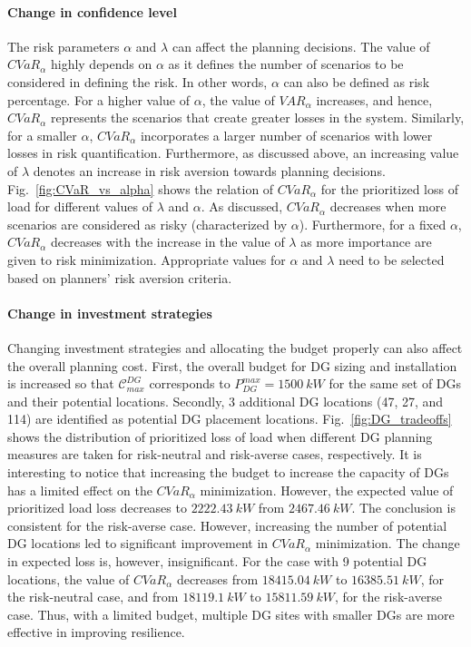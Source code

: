 \documentclass[hidelinks, 12pt]{article}
\begin{document}
\paragraph{Change in confidence level}
The risk parameters $\alpha$ and $\lambda$ can affect the planning decisions. The value of $CVaR_\alpha$ highly depends on $\alpha$ as it defines the number of scenarios to be considered in defining the risk. In other words, $\alpha$ can also be defined as risk percentage. For a higher value of $\alpha$, the value of $VAR_\alpha$ increases, and hence, $CVaR_\alpha$ represents the scenarios that create greater losses in the system. Similarly, for a smaller $\alpha$, $CVaR_\alpha$ incorporates a larger number of scenarios with lower losses in risk quantification. Furthermore, as discussed above, an increasing value of $\lambda$ denotes an increase in risk aversion towards planning decisions. Fig.~\ref{fig:CVaR_vs_alpha} shows the relation of $CVaR_\alpha$ for the prioritized loss of load for different values of $\lambda$ and $\alpha$. As discussed, $CVaR_\alpha$ decreases when more scenarios are considered as risky (characterized by $\alpha$). Furthermore, for a fixed $\alpha$, $CVaR_\alpha$ decreases with the increase in the value of $\lambda$ as more importance are given to risk minimization. Appropriate values for $\alpha$ and $\lambda$ need to be selected based on planners' risk aversion criteria.

\paragraph{Change in investment strategies}
Changing investment strategies and allocating the budget properly can also affect the overall planning cost. First, the overall budget for DG sizing and installation is increased so that $\mathcal{C}^{DG}_{max}$ corresponds to $P_{DG}^{max} = 1500~kW$ for the same set of DGs and their potential locations. Secondly, 3 additional DG locations (47, 27, and 114) are identified as potential DG placement locations. Fig.~\ref{fig:DG_tradeoffs} shows the distribution of prioritized loss of load when different DG planning measures are taken for risk-neutral and risk-averse cases, respectively. It is interesting to notice that increasing the budget to increase the capacity of DGs has a limited effect on the $CVaR_\alpha$ minimization. However, the expected value of prioritized load loss decreases to $2222.43~kW$ from $2467.46~kW$. The conclusion is consistent for the risk-averse case. However, increasing the number of potential DG locations led to significant improvement in $CVaR_\alpha$ minimization. The change in expected loss is, however, insignificant. For the case with 9 potential DG locations, the value of $CVaR_\alpha$ decreases from $18415.04~kW$ to $16385.51~kW$, for the risk-neutral case, and from $18119.1~kW$ to $15811.59~kW$, for the risk-averse case. Thus, with a limited budget, multiple DG sites with smaller DGs are more effective in improving resilience. 
\end{document}
